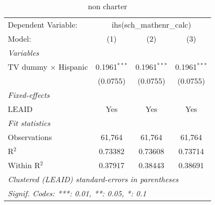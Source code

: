 \begin{table}[htbp]
\centering
\caption{non charter}
\begin{tabular}{lccc}
\tabularnewline\midrule\midrule
Dependent Variable:&\multicolumn{3}{c}{ihs(sch\_mathenr\_calc)}\\
Model:&(1) & (2) & (3)\\
\midrule \emph{Variables}&   &   &  \\
TV dummy $\times$ Hispanic & 0.1961$^{***}$ & 0.1961$^{***}$ & 0.1961$^{***}$\\
  &(0.0755) & (0.0755) & (0.0755)\\
\midrule \emph{Fixed-effects}&   &   &  \\
LEAID & Yes & Yes & Yes\\
\midrule \emph{Fit statistics}&  & & \\
Observations & 61,764&61,764&61,764\\
R$^2$ & 0.73382&0.73608&0.73714\\
Within R$^2$ & 0.37917&0.38443&0.38691\\
\midrule\midrule\multicolumn{4}{l}{\emph{Clustered (LEAID) standard-errors in parentheses}}\\
\multicolumn{4}{l}{\emph{Signif. Codes: ***: 0.01, **: 0.05, *: 0.1}}\\
\end{tabular}
\end{table}

